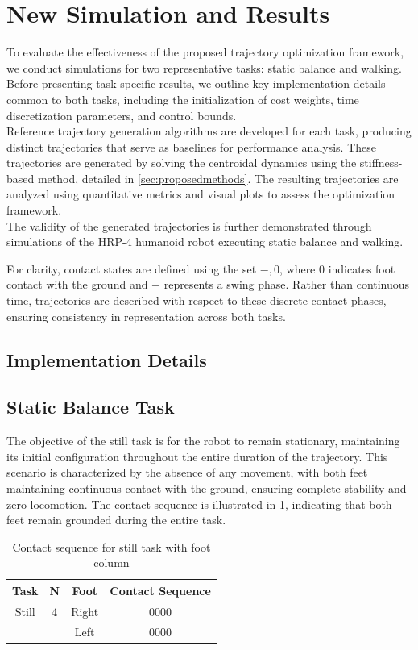 \documentclass[main.tex]{subfiles}
\begin{document}
\section{New Simulation and Results}
\label{sec:newsimulation}
To evaluate the effectiveness of the proposed trajectory optimization framework, we conduct simulations for two representative tasks: static balance and walking. Before presenting task-specific results, we outline key implementation details common to both tasks, including the initialization of cost weights, time discretization parameters, and control bounds.\\
Reference trajectory generation algorithms are developed for each task, producing distinct trajectories that serve as baselines for performance analysis. These trajectories are generated by solving the centroidal dynamics using the stiffness-based method, detailed in \ref{sec:proposedmethods}. The resulting trajectories are analyzed using quantitative metrics and visual plots to assess the optimization framework.\\ 
The validity of the generated trajectories is further demonstrated through simulations of the HRP-4 humanoid robot executing static balance and walking.\\
\begin{remark}
    For clarity, contact states are defined using the set ${-, 0}$, where $0$ indicates foot contact with the ground and $-$ represents a swing phase. Rather than continuous time, trajectories are described with respect to these discrete contact phases, ensuring consistency in representation across both tasks.
\end{remark}



\subsection{Implementation Details}


\subsection{Static Balance Task}
The objective of the still task is for the robot to remain stationary, maintaining its initial configuration throughout the entire duration of the trajectory. This scenario is characterized by the absence of any movement, with both feet maintaining continuous contact with the ground, ensuring complete stability and zero locomotion. The contact sequence is illustrated in \ref{tab:stilltask}, indicating that both feet remain grounded during the entire task. \\ 
\begin{table}[h!]
    \label{tab:stilltask}
    \centering
    \begin{tabular}{|c|c|c|c|}
        \hline
        Task & N & Foot & Contact Sequence \\
        \hline
        Still & 4 & Right & 0000 \\
        & & Left & 0000 \\
        \hline
    \end{tabular}
    \caption{Contact sequence for still task with foot column}
\end{table}
\end{document}
